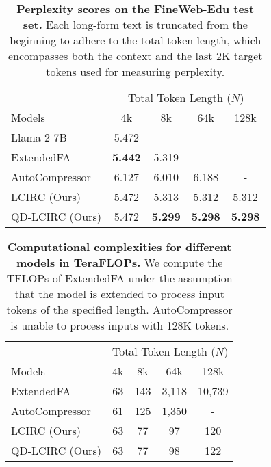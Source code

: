 \begin{table}[t]
\small
\centering
\begin{tabular}{lcccc}
\toprule
 & \multicolumn{4}{c}{Total Token Length ($N$)}\\
 \cmidrule(lr){2-5}
Models & 4k & 8k & 64k & 128k\\ \midrule
Llama-2-7B & 5.472 & - & - & - \\
ExtendedFA & \textbf{5.442} & 5.319 & - & - \\
AutoCompressor & 6.127 & 6.010 & 6.188 & -\\
LCIRC (Ours) & 5.472 & 5.313 & 5.312 & 5.312\\
QD-LCIRC (Ours) & 5.472 & \textbf{5.299} & \textbf{5.298} & \textbf{5.298}\\ \bottomrule
\end{tabular}
\caption{
\textbf{Perplexity scores on the FineWeb-Edu test set.} 
Each long-form text is truncated from the beginning to adhere to the total token length, which encompasses both the context and the last 2K target tokens used for measuring perplexity.
}
\label{table:ppl}
\end{table}

\begin{table}[t]
\small
\centering
\begin{tabular}{lcccc}
\toprule
 & \multicolumn{4}{c}{Total Token Length ($N$)}\\
 \cmidrule(lr){2-5}
Models & 4k & 8k & 64k & 128k\\ \midrule
ExtendedFA & 63 & 143 & 3,118 & 10,739 \\
AutoCompressor & 61 & 125 & 1,350 & -\\
LCIRC (Ours) & 63 & 77 & 97 & 120\\
QD-LCIRC (Ours) & 63 & 77 & 98 & 122\\ \bottomrule
\end{tabular}
\caption{
\textbf{Computational complexities for different models in TeraFLOPs.}
We compute the TFLOPs of ExtendedFA under the assumption that the model is extended to process input tokens of the specified length.
AutoCompressor is unable to process inputs with 128K tokens.
}
\label{table:cost}
\end{table}

